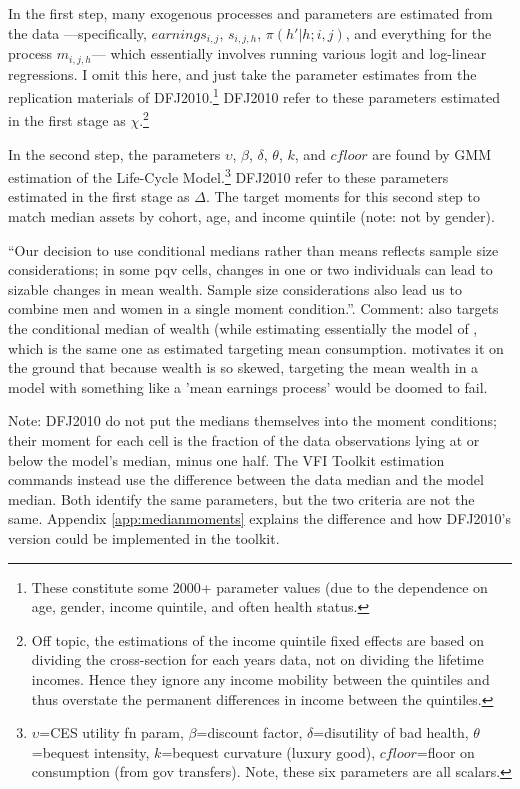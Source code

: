 \documentclass[11pt,fleqn]{article}
\begin{document}
In the first step, many exogenous processes and parameters are estimated from the data ---specifically, $earnings_{i,j}$, $s_{i,j,h}$, $\pi(h'|h; i,j)$, and everything for the process $m_{i,j,h}$--- which essentially involves running various logit and log-linear regressions. I omit this here, and just take the parameter estimates from the replication materials of DFJ2010.\footnote{These constitute some 2000+ parameter values (due to the dependence on age, gender, income quintile, and often health status.} DFJ2010 refer to these parameters estimated in the first stage as $\chi$.\footnote{Off topic, the estimations of the income quintile fixed effects are based on dividing the cross-section for each years data, not on dividing the lifetime incomes. Hence they ignore any income mobility between the quintiles and thus overstate the permanent differences in income between the quintiles.}

In the second step, the parameters $\upsilon$, $\beta$, $\delta$, $\theta$, $k$, and $cfloor$ are found by GMM estimation of the Life-Cycle Model.\footnote{$\upsilon$=CES utility fn param, $\beta$=discount factor, $\delta$=disutility of bad health, $\theta$=bequest intensity, $k$=bequest curvature (luxury good), $cfloor$=floor on consumption (from gov transfers). Note, these six parameters are all scalars.} DFJ2010 refer to these parameters estimated in the first stage as $\Delta$. The target moments for this second step to match median assets by cohort, age, and income quintile (note: not by gender).

``Our decision to use conditional medians rather than means reflects sample size considerations; in some pqv cells, changes in one or two individuals can lead to sizable changes in mean wealth. Sample size considerations also lead us to combine men and women in a single moment condition.''. Comment: \cite*{Cagetti2003} also targets the conditional median of wealth (while estimating essentially the model of \cite*{Carroll1997}, which is the same one as \cite*{GourinchasParker2002} estimated targeting mean consumption. \cite*{Cagetti2003} motivates it on the ground that because wealth is so skewed, targeting the mean wealth in a model with something like a 'mean earnings process' would be doomed to fail.

Note: DFJ2010 do not put the medians themselves into the moment conditions; their moment for each cell is the fraction of the data observations lying at or below the model's median, minus one half. The VFI Toolkit estimation commands instead use the difference between the data median and the model median. Both identify the same parameters, but the two criteria are not the same. Appendix \ref{app:medianmoments} explains the difference and how DFJ2010's version could be implemented in the toolkit.
\end{document}
